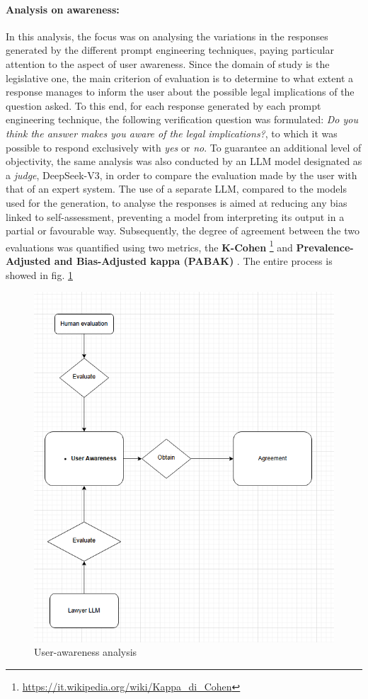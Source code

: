 \paragraph{Analysis on awareness:} 
In this analysis, the focus was on analysing the variations in the responses generated by the different prompt engineering techniques, paying particular attention to the aspect of user awareness. Since the domain of study is the legislative one, the main criterion of evaluation is to determine to what extent a response manages to inform the user about the possible legal implications of the question asked. To this end, for each response generated by each prompt engineering technique, the following verification question was formulated: \textit{Do you think the answer makes you aware of the legal implications?}, to which it was possible to respond exclusively with \textit{yes} or \textit{no}. To guarantee an additional level of objectivity, the same analysis was also conducted by an LLM model designated as a \textit{judge}, DeepSeek-V3, in order to compare the evaluation made by the user with that of an expert system.
The use of a separate LLM, compared to the models used for the generation, to analyse the responses is aimed at reducing any bias linked to self-assessment, preventing a model from interpreting its output in a partial or favourable way.
Subsequently, the degree of agreement between the two evaluations was quantified using two metrics, the \textbf{K-Cohen} \footnote{\url{https://it.wikipedia.org/wiki/Kappa_di_Cohen}} and \textbf{Prevalence-Adjusted and Bias-Adjusted kappa (PABAK)} \cite{Pabak}. The entire process is showed in fig. \ref{fig:Agreem}
\begin{figure}[h]
    \centering
    \includegraphics[width=0.7\linewidth]{Figures/Agreement.png}
    \caption{User-awareness analysis}
    \label{fig:Agreem}
\end{figure}
